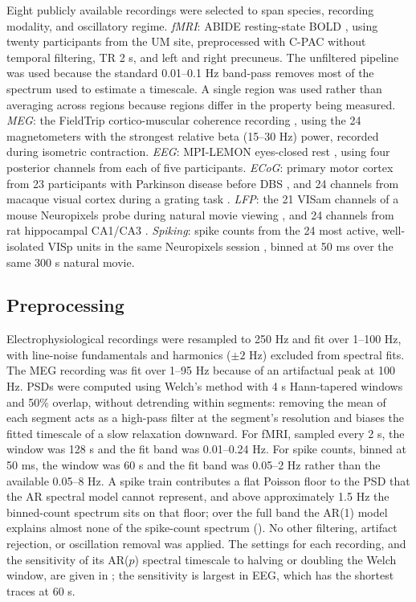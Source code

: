 \documentclass[pdflatex,sn-mathphys-num]{sn-jnl}
\begin{document}
Eight publicly available recordings were selected to span species, recording modality, and oscillatory regime. \textit{fMRI}: ABIDE resting-state BOLD \cite{di_martino_autism_2014}, using twenty participants from the UM site, preprocessed with C-PAC without temporal filtering, TR 2 s, and left and right precuneus. The unfiltered pipeline was used because the standard 0.01--0.1 Hz band-pass removes most of the spectrum used to estimate a timescale. A single region was used rather than averaging across regions because regions differ in the property being measured. \textit{MEG}: the FieldTrip cortico-muscular coherence recording \cite{schoffelen_neuronal_2005, oostenveld_fieldtrip_2011}, using the 24 magnetometers with the strongest relative beta (15--30 Hz) power, recorded during isometric contraction. \textit{EEG}: MPI-LEMON eyes-closed rest \cite{babayan_mind_2019}, using four posterior channels from each of five participants. \textit{ECoG}: primary motor cortex from 23 participants with Parkinson disease before DBS \cite{cole_nonsinusoidal_2017}, and 24 channels from macaque visual cortex during a grating task \cite{nagasaka_multidimensional_2011}. \textit{LFP}: the 21 VISam channels of a mouse Neuropixels probe during natural movie viewing \cite{siegle_survey_2021}, and 24 channels from rat hippocampal CA1/CA3 \cite{mizuseki_theta_2009, mizuseki_hc3_2013}. \textit{Spiking}: spike counts from the 24 most active, well-isolated VISp units in the same Neuropixels session \cite{siegle_survey_2021}, binned at 50 ms over the same 300 s natural movie.

\subsection{Preprocessing}

Electrophysiological recordings were resampled to 250 Hz and fit over 1--100 Hz, with line-noise fundamentals and harmonics ($\pm 2$ Hz) excluded from spectral fits. The MEG recording was fit over 1--95 Hz because of an artifactual peak at 100 Hz. PSDs were computed using Welch's method with 4 s Hann-tapered windows and 50\% overlap, without detrending within segments: removing the mean of each segment acts as a high-pass filter at the segment's resolution and biases the fitted timescale of a slow relaxation downward. For fMRI, sampled every 2 s, the window was 128 s and the fit band was 0.01--0.24 Hz. For spike counts, binned at 50 ms, the window was 60 s and the fit band was 0.05--2 Hz rather than the available 0.05--8 Hz. A spike train contributes a flat Poisson floor to the PSD that the AR spectral model cannot represent, and above approximately 1.5 Hz the binned-count spectrum sits on that floor; over the full band the AR(1) model explains almost none of the spike-count spectrum (). No other filtering, artifact rejection, or oscillation removal was applied. The settings for each recording, and the sensitivity of its AR($p$) spectral timescale to halving or doubling the Welch window, are given in ; the sensitivity is largest in EEG, which has the shortest traces at 60 s.
\end{document}
